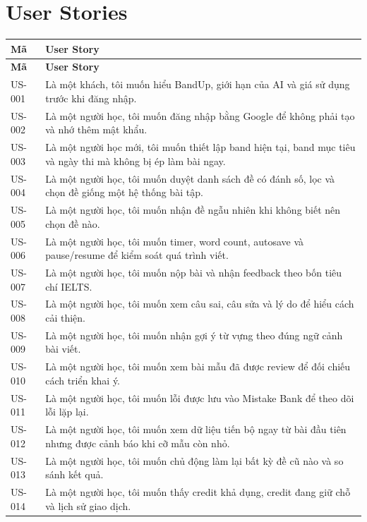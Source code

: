 \documentclass[11pt,a4paper]{article}
\begin{document}
\section{User Stories}
\small
\setlength{\tabcolsep}{4pt}
\renewcommand{\arraystretch}{1.18}
\begin{longtable}{|P{0.14\textwidth}|P{0.78\textwidth}|}
\hline
\textbf{Mã} & \textbf{User Story} \\ \hline
\endfirsthead
\hline
\textbf{Mã} & \textbf{User Story} \\ \hline
\endhead
US-001 & Là một khách, tôi muốn hiểu BandUp, giới hạn của AI và giá sử dụng trước khi đăng nhập. \\ \hline
US-002 & Là một người học, tôi muốn đăng nhập bằng Google để không phải tạo và nhớ thêm mật khẩu. \\ \hline
US-003 & Là một người học mới, tôi muốn thiết lập band hiện tại, band mục tiêu và ngày thi mà không bị ép làm bài ngay. \\ \hline
US-004 & Là một người học, tôi muốn duyệt danh sách đề có đánh số, lọc và chọn đề giống một hệ thống bài tập. \\ \hline
US-005 & Là một người học, tôi muốn nhận đề ngẫu nhiên khi không biết nên chọn đề nào. \\ \hline
US-006 & Là một người học, tôi muốn timer, word count, autosave và pause/\allowbreak{}resume để kiểm soát quá trình viết. \\ \hline
US-007 & Là một người học, tôi muốn nộp bài và nhận feedback theo bốn tiêu chí IELTS. \\ \hline
US-008 & Là một người học, tôi muốn xem câu sai, câu sửa và lý do để hiểu cách cải thiện. \\ \hline
US-009 & Là một người học, tôi muốn nhận gợi ý từ vựng theo đúng ngữ cảnh bài viết. \\ \hline
US-010 & Là một người học, tôi muốn xem bài mẫu đã được review để đối chiếu cách triển khai ý. \\ \hline
US-011 & Là một người học, tôi muốn lỗi được lưu vào Mistake Bank để theo dõi lỗi lặp lại. \\ \hline
US-012 & Là một người học, tôi muốn xem dữ liệu tiến bộ ngay từ bài đầu tiên nhưng được cảnh báo khi cỡ mẫu còn nhỏ. \\ \hline
US-013 & Là một người học, tôi muốn chủ động làm lại bất kỳ đề cũ nào và so sánh kết quả. \\ \hline
US-014 & Là một người học, tôi muốn thấy credit khả dụng, credit đang giữ chỗ và lịch sử giao dịch. \\ \hline

\end{longtable}
\end{document}
